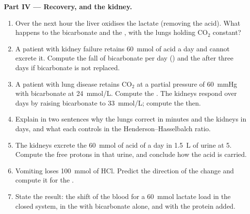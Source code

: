 \begin{problem}
\medskip
\noindent\textbf{Part IV --- Recovery, and the kidney.}
\begin{enumerate}[resume]
  \item Over the next hour the liver oxidises the lactate (removing
        the acid). What happens to the bicarbonate and the , with the
        lungs holding $\mathrm{CO_2}$ constant?
  \item A patient with kidney failure retains \qty{60}{mmol} of acid
        a day and cannot excrete it. Compute the fall of bicarbonate
        per day () and the  after three days if
        bicarbonate is not replaced.
  \item A patient with lung disease retains $\mathrm{CO_2}$ at a
        partial pressure of \qty{60}{mmHg} with bicarbonate at
        \qty{24}{mmol/L}. Compute the . The kidneys respond over days
        by raising bicarbonate to \qty{33}{mmol/L}; compute the 
        then.
  \item Explain in two sentences why the lungs correct  in minutes
        and the kidneys in days, and what each controls in the
        Henderson--Hasselbalch ratio.
  \item The kidneys excrete the \qty{60}{mmol} of acid of a day in
        \qty{1.5}{L} of urine at  5. Compute the free protons in that
        urine, and conclude how the acid is carried.
  \item Vomiting loses \qty{100}{mmol} of HCl. Predict the direction of
        the  change and compute it for the .
  \item State the result: the  shift of the blood for a
        \qty{60}{mmol} lactate load in the closed system, in the  with bicarbonate alone, and with the protein 
        added.
\end{enumerate}
\end{problem}
